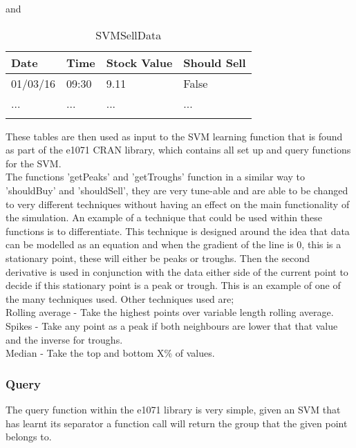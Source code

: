 \documentclass[12pt,a4paper]{article}
\begin{document}
and

\label{units}
\begin{longtable}{ |p{2.25cm}|p{2.25cm}|p{2.25cm}|p{2.25cm}| }\hline\hline
Date & Time & Stock Value & Should Sell \\ \hline
01/03/16 & 09:30 & 9.11 & False  \\ \hline
... & ... & ... & ...  \\ \hline
\caption{SVMSellData}
\end{longtable}

These tables are then used as input to the SVM learning function that is found as part of the e1071 CRAN library, which contains all set up and query functions for the SVM.\\

The functions 'getPeaks' and 'getTroughs' function in a similar way to 'shouldBuy' and 'shouldSell', they are very tune-able and are able to be changed to very different techniques without having an effect on the main functionality of the simulation. An example of a technique that could be used within these functions is to differentiate. This technique is designed around the idea that data can be modelled as an equation and when the gradient of the line is 0, this is a stationary point, these will either be peaks or troughs. Then the second derivative is used in conjunction with the data either side of the current point to decide if this stationary point is a peak or trough. This is an example of one of the many techniques used. Other techniques used are; \\

Rolling average - Take the highest points over variable length rolling average. \\
Spikes - Take any point as a peak if both neighbours are lower that that value and the inverse for troughs. \\
Median - Take the top and bottom X\% of values. 

\subsubsection*{Query}

The query function within the e1071 library is very simple, given an SVM that has learnt its separator a function call will return the group that the given point belongs to.
\end{document}
